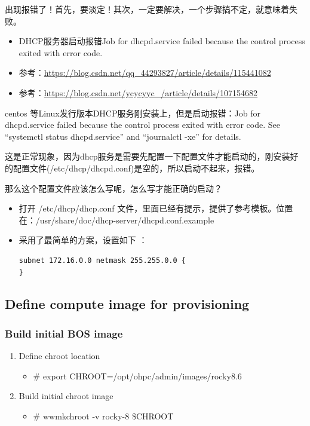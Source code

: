 {出现报错了！首先，要淡定！其次，一定要解决，一个步骤搞不定，就意味着失败。
\begin{itemize}
\item DHCP服务器启动报错Job for dhcpd.service failed because the control process exited with error code.
\item 参考：\url{https://blog.csdn.net/qq_44293827/article/details/115441082}
\item 参考：\url{https://blog.csdn.net/ycycyyc_/article/details/107154682}
\end{itemize}
centos 等Linux发行版本DHCP服务刚安装上，但是启动报错：Job for dhcpd.service failed because the control process exited with error code. See “systemctl status dhcpd.service” and “journalctl -xe” for details.

这是正常现象，因为dhcp服务是需要先配置一下配置文件才能启动的，刚安装好的配置文件(/etc/dhcp/dhcpd.conf)是空的，所以启动不起来，报错。

那么这个配置文件应该怎么写呢，怎么写才能正确的启动？

\begin{itemize}
\item 打开 /etc/dhcp/dhcp.conf 文件，里面已经有提示，提供了参考模板。位置在：/usr/share/doc/dhcp-server/dhcpd.conf.example
\item 采用了最简单的方案，设置如下 ： 
\begin{verbatim}
subnet 172.16.0.0 netmask 255.255.0.0 {
}
\end{verbatim}
\end{itemize}


\subsection{Define compute image for provisioning}
\subsubsection{Build initial BOS image}
\begin{enumerate}
\item Define chroot location
\begin{itemize}
\item \# export CHROOT=/opt/ohpc/admin/images/rocky8.6
\end{itemize}

\item Build initial chroot image
\begin{itemize}
\item \# wwmkchroot -v rocky-8 \$CHROOT
\end{itemize}


\end{enumerate}}
